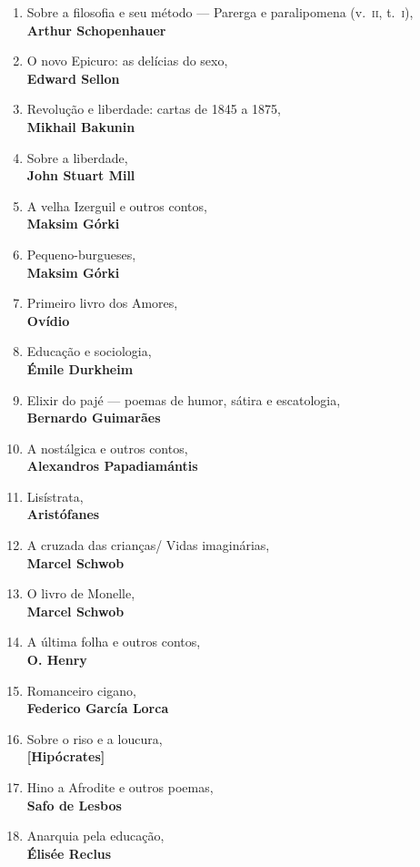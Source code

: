 \begin{enumerate} [font=\Formular\scriptsize]
\item Sobre a filosofia e seu método --- Parerga e paralipomena (v.~\textsc{ii}, t.~\textsc{i}),\\ \textbf{Arthur Schopenhauer} 
\item O novo Epicuro: as delícias do sexo,\\ \textbf{Edward Sellon}
\item Revolução e liberdade: cartas de 1845 a 1875,\\ \textbf{Mikhail Bakunin}
\item Sobre a liberdade,\\ \textbf{John Stuart Mill}
\item A velha Izerguil e outros contos,\\ \textbf{Maksim Górki}
\item Pequeno-burgueses,\\ \textbf{Maksim Górki}
\item Primeiro livro dos Amores,\\ \textbf{Ovídio}
\item Educação e sociologia,\\ \textbf{Émile Durkheim}
\item Elixir do pajé --- poemas de humor, sátira e escatologia,\\ \textbf{Bernardo Guimarães}
\item A nostálgica e outros contos,\\ \textbf{Alexandros Papadiamántis}
\item Lisístrata,\\ \textbf{Aristófanes}
\item A cruzada das crianças/ Vidas imaginárias,\\ \textbf{Marcel Schwob}
\item O livro de Monelle,\\ \textbf{Marcel Schwob}
\item A última folha e outros contos,\\ \textbf{O. Henry}
\item Romanceiro cigano,\\ \textbf{Federico García Lorca}
\item Sobre o riso e a loucura,\\ \textbf{{[}Hipócrates{]}}
\item Hino a Afrodite e outros poemas,\\ \textbf{Safo de Lesbos}
\item Anarquia pela educação,\\ \textbf{Élisée Reclus}

\end{enumerate}
